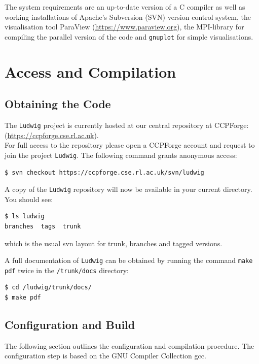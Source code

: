 \documentclass[11pt,twoside,a4paper]{article}
\begin{document}
The system requirements are an up-to-date version of a C compiler as well as working installations 
of Apache's Subversion (SVN) version control system, the visualisation tool
ParaView (\hyperref[ParaView]{https://www.paraview.org}), the MPI-library 
for compiling the parallel version of the code and \texttt{gnuplot} for simple visualisations.

\section{Access and Compilation}

\subsection{Obtaining the Code}
\label{sec:getCode}

The \texttt{Ludwig} project is currently hosted at our central repository 
at CCPForge:\\
(\hyperref[CCPForge]{https://ccpforge.cse.rl.ac.uk}).\\
For full access to the repository please open a CCPForge account and request
to join the project \texttt{Ludwig}. The following command grants anonymous access:

\begin{lstlisting}[style=terminalverbatim]
$ svn checkout https://ccpforge.cse.rl.ac.uk/svn/ludwig
\end{lstlisting}

A copy of the \texttt{Ludwig} repository will now be available in your current directory. 
You should see:

\begin{lstlisting}
$ ls ludwig
branches  tags  trunk
\end{lstlisting}
which is the usual svn layout for trunk, branches and tagged versions.

A full documentation of \texttt{Ludwig} can be obtained by running 
the command \texttt{make pdf} twice in the \texttt{/trunk/docs} directory:

\begin{lstlisting}[style=terminalverbatim]
$ cd /ludwig/trunk/docs/
$ make pdf
\end{lstlisting}

\subsection{Configuration and Build}

The following section outlines the configuration and compilation 
procedure. The configuration step is based on the GNU Compiler Collection gcc.
\end{document}
